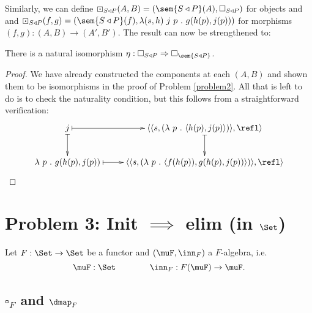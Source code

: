 \documentclass{article}
\begin{document}
Similarly, we can define $\boxdot_{S \triangleleft P}(A, B) = (\sem{S
  \triangleleft P}(A), \square_{S \triangleleft P})$ for objects and
and $\boxdot_{S \triangleleft P}(f, g) = (\sem{S \triangleleft P}(f),
\lambda (s, h)\ j\ p\ .\ g(h(p), j(p) ))$ for morphisms $(f, g) : (A,
B) \to (A', B')$. The result can now be strengthened to:

\begin{proposition}
  There is a natural isomorphism $\eta : \square_{S \triangleleft P} \Rightarrow \square_{\sem{S \triangleleft P}}$.
\end{proposition}
\begin{proof}
  We have already constructed the components at each $(A, B)$ and
  shown them to be isomorphisms in the proof of Problem
  \ref{problem2}. All that is left to do is to check the naturality
  condition, but this follows from a straightforward verification:
  \[
  \xymatrix
  {
    j \ar@{|->}[r] \ar@{|->}[d] & {\langle\langle s , (\lambda\ p\ .\ \langle h(p), j(p)\rangle)\rangle, \refl\rangle}
                                   \ar@{|->}[d] \\
    {\lambda\ p\ .\ g(h(p), j(p))} \ar@{|->}[r] & {\langle\langle s , (\lambda\ p\ .\ \langle f(h(p)), g(h(p), j(p))\rangle)\rangle, \refl\rangle}
  }
  \]
  
\end{proof}


\section*{Problem 3: Init $\implies$ elim (in $\Set$)}

Let $F : \Set \to \Set$ be a functor and $(\muF, \inn_F)$ a $F$-algebra, i.e.\ 
\[
\muF : \Set \qquad \qquad \inn_F : F (\muF) \to \muF.
\]

\subsection*{$\square_F$ and $\dmap_F$}
\end{document}
